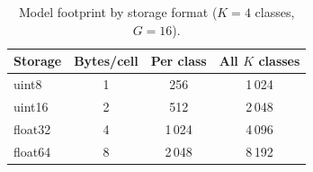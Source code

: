 
\begin{table}[!ht]
  \centering
  \caption{Model footprint by storage format ($K=4$ classes, $G=16$).}
  \label{tab:footprint}
  \begin{tabular}{lccc}
    \hline
    Storage & Bytes/cell & Per class & All $K$ classes\\
    \hline
    uint8   & 1 & 256  & 1\,024\\
    uint16  & 2 & 512  & 2\,048\\
    float32 & 4 & 1\,024 & 4\,096\\
    float64 & 8 & 2\,048 & 8\,192\\
    \hline
  \end{tabular}
\end{table}